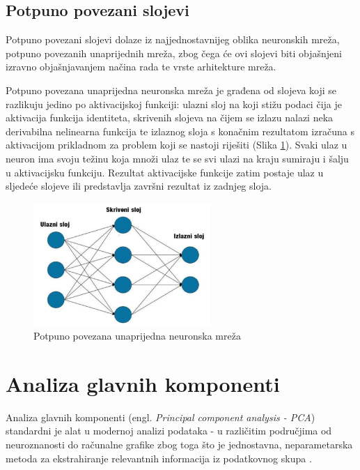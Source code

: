 \documentclass[times, utf8, proizvoljni, numeric]{fer}
\begin{document}
\subsection{Potpuno povezani slojevi}

Potpuno povezani slojevi dolaze iz najjednostavnijeg oblika neuronskih mreža, potpuno povezanih unaprijednih mreža, zbog čega će ovi slojevi biti objašnjeni izravno objašnjavanjem načina rada te vrste arhitekture mreža.
 
Potpuno povezana unaprijedna neuronska mreža je građena od slojeva koji se razlikuju jedino po aktivacijskoj funkciji: ulazni sloj na koji stižu podaci čija je aktivacija funkcija identiteta, skrivenih slojeva na čijem se izlazu nalazi neka derivabilna nelinearna funkcija te izlaznog sloja s konačnim rezultatom izračuna s aktivacijom prikladnom za problem koji se nastoji riješiti (Slika \ref{fg:potpuno_povezana}). Svaki ulaz u neuron ima svoju težinu koja množi ulaz te se svi ulazi na kraju sumiraju i šalju u aktivacijsku funkciju. Rezultat aktivacijske funkcije zatim postaje ulaz u sljedeće slojeve ili predstavlja završni rezultat iz zadnjeg sloja.

\begin{figure}[!ht]
	\begin{center}
		\captionsetup{justification=centering}
		\includegraphics[width=0.6\textwidth]{./imgs/potpuno_povezana.png}
		\caption{Potpuno povezana unaprijedna neuronska mreža}
		\label{fg:potpuno_povezana}
	\end{center}
\end{figure}

\section{Analiza glavnih komponenti}

Analiza glavnih komponenti (engl. \textit{Principal component analysis - PCA}) standardni je alat u modernoj analizi podataka - u različitim područjima od neuroznanosti do računalne grafike zbog toga što je jednostavna, neparametarska metoda za ekstrahiranje relevantnih informacija iz podatkovnog skupa \cite{PCA}.
\end{document}

